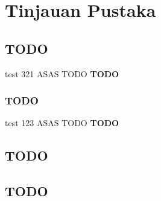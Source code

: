     \newpage

    {\centering
        \renewcommand{\thesection}{\arabic{section}.}
        \section{
            \fontsize{\fontChapterTitle}{0}\selectfont    
            Tinjauan Pustaka
        }
    }

    \subsection{TODO}
    test 321 ASAS TODO \textbf{TODO}

    \subsubsection{TODO}
    test 123 ASAS TODO \textbf{TODO}

    \subsection{TODO}
    \subsection{TODO}

